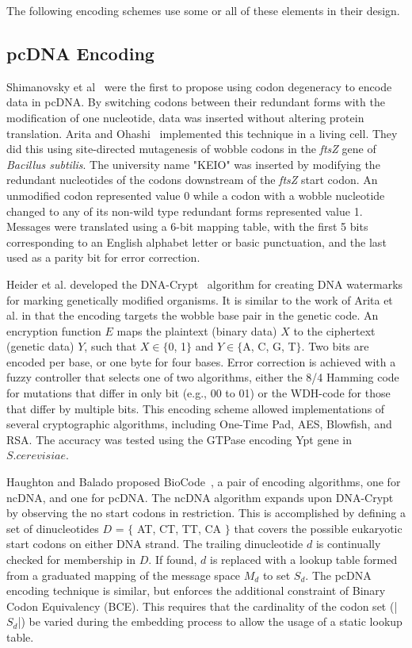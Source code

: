 \documentclass[USenglish,oneside,twocolumn]{article}
\begin{document}
The following encoding schemes use some or all of these elements in their design.

\subsection{pcDNA Encoding}

Shimanovsky et al~\cite{SFHC2003BL} were the first to propose using codon degeneracy to encode data in pcDNA. By switching codons between their redundant forms with the modification of one nucleotide, data was inserted without altering protein translation. Arita and Ohashi~\cite{AY2004BP} implemented this technique in a living cell. They did this using site-directed mutagenesis of wobble codons in the \textit{ftsZ} gene of \textit{Bacillus subtilis}. The university name "KEIO" was inserted by modifying the redundant nucleotides of the codons downstream of the \textit{ftsZ} start codon. An unmodified codon represented value 0 while a codon with a wobble nucleotide changed to any of its non-wild type redundant forms represented value 1. Messages were translated using a 6-bit mapping table, with the first 5 bits corresponding to an English alphabet letter or basic punctuation, and the last used as a parity bit for error correction.

Heider et al. developed the DNA-Crypt~\cite{HBBMC2007} algorithm for creating DNA watermarks for marking genetically modified organisms. It is similar to the work of Arita et al. in that the encoding targets the wobble base pair in the genetic code. An encryption function $E$ maps the plaintext (binary data) $X$ to the ciphertext (genetic data) $Y$, such that $X \in  \{$0, 1$\}$ and $Y \in \{$A, C, G, T$\}$. Two bits are encoded per base, or one byte for four bases. Error correction is achieved with a fuzzy controller that selects one of two algorithms, either the 8/4 Hamming code for mutations that differ in only bit (e.g., 00 to 01) or the WDH-code for those that differ by multiple bits. This encoding scheme allowed implementations of several cryptographic algorithms, including One-Time Pad, AES, Blowfish, and RSA. The accuracy was tested using the GTPase encoding Ypt gene in $S. cerevisiae$.

Haughton and Balado proposed BioCode~\cite{HBBMC2013}, a pair of encoding algorithms, one for ncDNA, and one for pcDNA. The ncDNA algorithm expands upon DNA-Crypt by observing the no start codons in restriction. This is accomplished by defining a set of dinucleotides $D$ = $\{$ AT, CT, TT, CA $\}$ that covers the possible eukaryotic start codons on either DNA strand. The trailing dinucleotide $d$ is continually checked for membership in $D$. If found, $d$ is replaced with a lookup table formed from a graduated mapping of the message space $M_d$ to set $S_d$. The pcDNA encoding technique is similar, but enforces the additional constraint of Binary Codon Equivalency (BCE). This requires that the cardinality of the codon set (|$S_d$|) be varied during the embedding process to allow the usage of a static lookup table.
\end{document}
